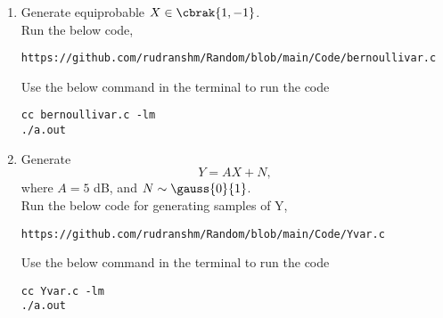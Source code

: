 \documentclass[journal,12pt,twocolumn]{IEEEtran}
\begin{document}
\begin{enumerate}[label=\thesection.\arabic*
,ref=\thesection.\theenumi]
\item Generate equiprobable $X \in \cbrak{1,-1}$.\\
\solution
Run the below code,
\begin{lstlisting}
https://github.com/rudranshm/Random/blob/main/Code/bernoullivar.c
\end{lstlisting}
Use the below command in the terminal to run the code
\begin{lstlisting}
cc bernoullivar.c -lm
./a.out
\end{lstlisting}
\item Generate 
\begin{equation}
Y = AX+N,
\end{equation}
		where $A = 5$ dB,  and $N \sim \gauss{0}{1}$.\\
\solution
Run the below code for generating samples of Y,
\begin{lstlisting}
https://github.com/rudranshm/Random/blob/main/Code/Yvar.c
\end{lstlisting}
Use the below command in the terminal to run the code
\begin{lstlisting}
cc Yvar.c -lm
./a.out
\end{lstlisting}


\end{enumerate}
\end{document}
